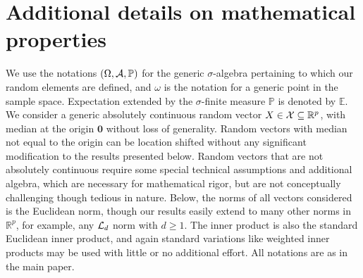 \documentclass[twoside]{article}
\begin{document}
%

%


\section{Additional details on mathematical properties}

We use the notations $(\Omega, {\cal{A}}, \mathbb{P})$ for the generic $\sigma$-algebra
pertaining to which our random elements are defined, and $\omega$ is the notation for 
a generic point in the sample space. Expectation extended by the $\sigma$-finite measure 
$\mathbb{P}$ is denoted by $\mathbb{E}$.
We consider a generic absolutely continuous random vector 
$X \in {\cal{X}} \subseteq \mathbb{R}^{p}$, 
with median at the origin $\mathbf{0}$ without loss
of generality. Random vectors with median not equal to the origin can be location 
shifted without any significant modification to the results presented below. Random 
vectors that are not absolutely continuous require some special technical assumptions 
and additional algebra, which are necessary for mathematical rigor, but are not 
conceptually challenging though tedious in nature. Below, the norms of all vectors 
considered is the Euclidean norm, though our results easily extend to many other norms
in $\mathbb{R}^{p}$, for example, any ${\cal{L}}_{d}$ norm with $d \geq 1$. The inner 
product is also the standard Euclidean inner product, and again standard variations 
like weighted inner products may be used with little or no additional effort. All 
notations are as in the main paper.
\end{document}
